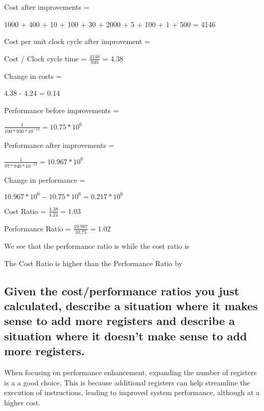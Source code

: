 \documentclass{article}
\begin{document}
Cost after improvements = 

\begin{center}
    1000 + 400 + 10 + 100 + 30 + 2000 + 5 + 100 + 1 + 500 = 4146
\end{center}

Cost per unit clock cycle after improvement = 

\begin{center}
Cost / Clock cycle time = $\frac{4146}{940}$ = 4.38
\end{center}

Change in costs =

\begin{center}
    4.38 - 4.24 = 0.14
\end{center}

\newpage

Performance before improvements = 
\begin{center}
    $\frac{1}{100 * 930 * 10^{-12}} = 10.75 * 10^6$
\end{center}

Performance after improvements = 

\begin{center}
    $\frac{1}{97 * 940 * 10^{-12}} = 10.967 * 10^6$
\end{center}

Change in performance = 

\begin{center}
    $10.967 * 10^6 - 10.75 * 10^6 = 0.217 * 10^6$
\end{center}

Cost Ratio = $\frac{4.38}{4.24} = 1.03$


Performance Ratio = $\frac{10.967}{10.75} = 1.02$

We see that the performance ratio is  while the cost ratio is 

The Cost Ratio is higher than the Performance Ratio by 

\subsection{Given the cost/performance ratios you just calculated, describe a situation where it makes sense to
add more registers and describe a situation where it
doesn’t make sense to add more registers.}

When focusing on performance enhancement, expanding the number of registers is a 
a good choice. This is because additional registers can help streamline the 
execution of instructions, leading to improved system performance, although at a 
higher cost.
\end{document}

